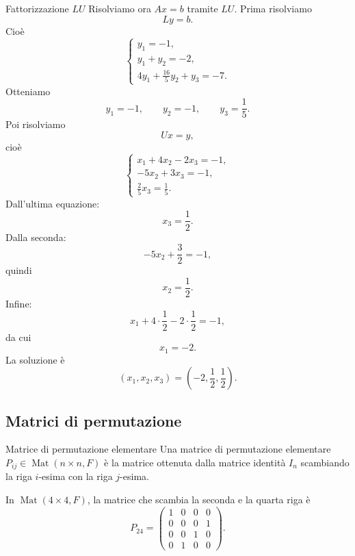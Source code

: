 \documentclass[a4paper]{article}
\begin{document}
\begin{snippetexample}{Fattorizzazione \(LU\)}
    Risolviamo ora \(Ax=b\) tramite \(LU\). Prima risolviamo
    \[
        Ly=b.
    \]
    Cioè
    \[
        \begin{cases}
            y_1=-1,\\
            y_1+y_2=-2,\\
            4y_1+\frac{16}{5}y_2+y_3=-7.
        \end{cases}
    \]
    Otteniamo
    \[
        y_1=-1,
        \qquad
        y_2=-1,
        \qquad
        y_3=\frac{1}{5}.
    \]
    Poi risolviamo
    \[
        Ux=y,
    \]
    cioè
    \[
        \begin{cases}
            x_1+4x_2-2x_3=-1,\\
            -5x_2+3x_3=-1,\\
            \frac{2}{5}x_3=\frac{1}{5}.
        \end{cases}
    \]
    Dall'ultima equazione:
    \[
        x_3=\frac{1}{2}.
    \]
    Dalla seconda:
    \[
        -5x_2+\frac{3}{2}=-1,
    \]
    quindi
    \[
        x_2=\frac{1}{2}.
    \]
    Infine:
    \[
        x_1+4\cdot\frac{1}{2}-2\cdot\frac{1}{2}=-1,
    \]
    da cui
    \[
        x_1=-2.
    \]
    La soluzione è
    \[
        (x_1,x_2,x_3)=\left(-2,\frac{1}{2},\frac{1}{2}\right).
    \]
\end{snippetexample}

\subsection{Matrici di permutazione}

\begin{snippetdefinition}{Matrice di permutazione elementare}
    Una matrice di permutazione elementare \(P_{ij}\in\operatorname{Mat}(n\times n,F)\) è la matrice ottenuta dalla matrice identità \(I_n\) scambiando la riga \(i\)-esima con la riga \(j\)-esima.
\end{snippetdefinition}

\begin{snippetexample}{}
    In \(\operatorname{Mat}(4\times 4,F)\), la matrice che scambia la seconda e la quarta riga è
    \[
        P_{24}=
        \begin{pmatrix}
            1 & 0 & 0 & 0\\
            0 & 0 & 0 & 1\\
            0 & 0 & 1 & 0\\
            0 & 1 & 0 & 0
        \end{pmatrix}.
    \]
\end{snippetexample}
\end{document}
